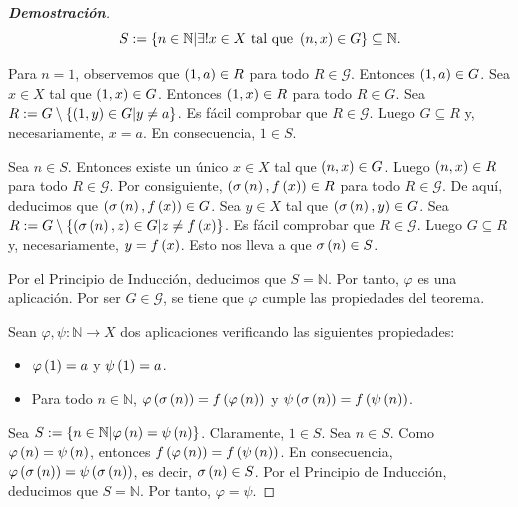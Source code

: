 \begin{theorem}
\begin{proof}[\rm\textbf{Demostración}]
    \begin{equation}
      S:=\left\{n\in\mathbb{N}\middle|\exists!x\in X\text{ tal que }\left(n,x\right)\in G\right\}\subseteq\mathbb{N}.
    \end{equation}
    
    Para $n=1$, observemos que $\left(1,a\right)\in R$ para todo $R\in\mathcal{G}$. Entonces $\left(1,a\right)\in G$. Sea $x\in X$ tal que $\left(1,x\right)\in G$. Entonces $\left(1,x\right)\in R$ para todo $R\in G$. Sea $R:=G\setminus\left\{\left(1,y\right)\in G\middle|y\neq a\right\}$. Es fácil comprobar que $R\in\mathcal{G}$. Luego $G\subseteq R$ y, necesariamente, $x=a$. En consecuencia, $1\in S$. 
    
    Sea $n\in S$. Entonces existe un único $x\in X$ tal que $\left(n,x\right)\in G$. Luego $\left(n,x\right)\in R$ para todo $R\in\mathcal{G}$. Por consiguiente, $\left(\sigma\left(n\right),f\left(x\right)\right)\in R$ para todo $R\in\mathcal{G}$. De aquí, deducimos que $\left(\sigma\left(n\right), f\left(x\right)\right)\in G$. Sea $y\in X$ tal que $\left(\sigma\left(n\right),y\right)\in G$. Sea $R:=G\setminus\left\{\left(\sigma\left(n\right),z\right)\in G\middle|z\neq f\left(x\right)\right\}$. Es fácil comprobar que $R\in\mathcal{G}$. Luego $G\subseteq R$ y, necesariamente, $y=f\left(x\right)$. Esto nos lleva a que $\sigma\left(n\right)\in S$. 
    
    Por el Principio de Inducción, deducimos que $S=\mathbb{N}$. Por tanto, $\varphi$ es una aplicación. Por ser $G\in\mathcal{G}$, se tiene que $\varphi$ cumple las propiedades del teorema.
    
    Sean $\varphi,\psi:\mathbb{N}\rightarrow X$ dos aplicaciones verificando las siguientes propiedades:

    \begin{itemize}
      \item $\varphi\left(1\right)=a$ y $\psi\left(1\right)=a$.
      \item Para todo $n\in\mathbb{N}$, $\varphi\left(\sigma\left(n\right)\right)=f\left(\varphi\left(n\right)\right)$ y $\psi\left(\sigma\left(n\right)\right)=f\left(\psi\left(n\right)\right)$.
    \end{itemize}

  Sea $S:=\left\{n\in\mathbb{N}\middle|\varphi\left(n\right)=\psi\left(n\right)\right\}$. Claramente, $1\in S$. Sea $n\in S$. Como $\varphi\left(n\right)=\psi\left(n\right)$, entonces $f\left(\varphi\left(n\right)\right)=f\left(\psi\left(n\right)\right)$. En consecuencia, $\varphi\left(\sigma\left(n\right)\right)=\psi\left(\sigma\left(n\right)\right)$, es decir, $\sigma\left(n\right)\in S$. Por el Principio de Inducción, deducimos que $S=\mathbb{N}$. Por tanto, $\varphi=\psi$.
  \end{proof}  
\end{theorem}

